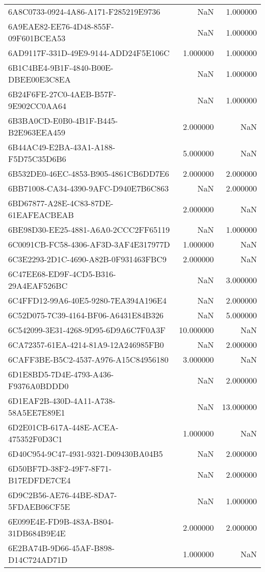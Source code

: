 \begin{tabular}{lrr}
6A8C0733-0924-4A86-A171-F285219E9736 & NaN & 1.000000 \\
6A9EAE82-EE76-4D48-855F-09F601BCEA53 & NaN & 1.000000 \\
6AD9117F-331D-49E9-9144-ADD24F5E106C & 1.000000 & 1.000000 \\
6B1C4BE4-9B1F-4840-B00E-DBEE00E3C8EA & NaN & 1.000000 \\
6B24F6FE-27C0-4AEB-B57F-9E902CC0AA64 & NaN & 1.000000 \\
6B3BA0CD-E0B0-4B1F-B445-B2E963EEA459 & 2.000000 & NaN \\
6B44AC49-E2BA-43A1-A188-F5D75C35D6B6 & 5.000000 & NaN \\
6B532DE0-46EC-4853-B905-4861CB6DD7E6 & 2.000000 & 2.000000 \\
6BB71008-CA34-4390-9AFC-D940E7B6C863 & NaN & 2.000000 \\
6BD67877-A28E-4C83-87DE-61EAFEACBEAB & 2.000000 & NaN \\
6BE98D30-EE25-4881-A6A0-2CCC2FF65119 & NaN & 1.000000 \\
6C0091CB-FC58-4306-AF3D-3AF4E317977D & 1.000000 & NaN \\
6C3E2293-2D1C-4690-A82B-0F931463FBC9 & 2.000000 & NaN \\
6C47EE68-ED9F-4CD5-B316-29A4EAF526BC & NaN & 3.000000 \\
6C4FFD12-99A6-40E5-9280-7EA394A196E4 & NaN & 2.000000 \\
6C52D075-7C39-4164-BF06-A6431E84B326 & NaN & 5.000000 \\
6C542099-3E31-4268-9D95-6D9A6C7F0A3F & 10.000000 & NaN \\
6CA72357-61EA-4214-81A9-12A246985FB0 & NaN & 2.000000 \\
6CAFF3BE-B5C2-4537-A976-A15C84956180 & 3.000000 & NaN \\
6D1E8BD5-7D4E-4793-A436-F9376A0BDDD0 & NaN & 2.000000 \\
6D1EAF2B-430D-4A11-A738-58A5EE7E89E1 & NaN & 13.000000 \\
6D2E01CB-617A-448E-ACEA-475352F0D3C1 & 1.000000 & NaN \\
6D40C954-9C47-4931-9321-D09430BA04B5 & NaN & 2.000000 \\
6D50BF7D-38F2-49F7-8F71-B17EDFDE7CE4 & NaN & 2.000000 \\
6D9C2B56-AE76-44BE-8DA7-5FDAEB06CF5E & NaN & 1.000000 \\
6E099E4E-FD9B-483A-B804-31DB684B9E4E & 2.000000 & 2.000000 \\
6E2BA74B-9D66-45AF-B898-D14C724AD71D & 1.000000 & NaN \\

\end{tabular}
